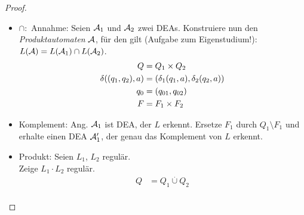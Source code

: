 {\begin{proof}
\begin{itemize}
\begin{figure}[tp]
            \caption{\acs{NEA} für Vereinigung}
            \label{fig:reg-closure-union}
        \end{figure}
        \item $\cap:$ 
        Annahme: Seien $\mathcal{A}_1$ und $\mathcal{A}_2$ zwei DEAs. Konstruiere nun  den \emph{Produktautomaten} $\mathcal{A}$, für den gilt (Aufgabe zum Eigenstudium!): $L(\mathcal{A}) = L(\mathcal{A}_1) \cap L(\mathcal{A}_2)$.
		\begin{align*}
			Q &= Q_1\times Q_2\\
			\delta((q_1,q_2),a) &= (\delta_1(q_1,a),\delta_2(q_2,a))\\
			q_0 &= (q_{01},q_{02})\\
			F &= F_1\times F_2\\
		\end{align*}
	\item Komplement: Ang. $\mathcal{A}_1$ ist \ac{DEA}, der $L$ erkennt. Ersetze $F_1$ durch $Q_1\setminus F_1$ und erhalte einen DEA $\mathcal{A}_1'$, der genau das Komplement von $L$ erkennt. 
%
%
        \item Produkt: Seien $L_1$, $L_2$ regulär.\\
                Zeige $L_1\cdot L_2$ regulär.
                \begin{align*}
                        Q &= Q_1 \overset.\cup Q_2\\

\end{align*}
\end{itemize}
\end{proof}}
